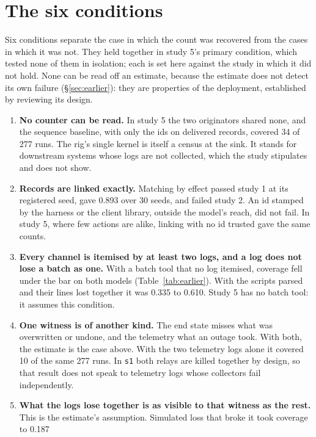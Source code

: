 \documentclass[11pt]{article}
\begin{document}
\section{The six conditions}
\label{sec:when}

Six conditions separate the case in which the count was recovered from the cases in
which it was not. They held together in study 5's primary condition, which tested none
of them in isolation; each is set here against the study in which it did not hold. None
can be read off an estimate, because the estimate does not detect its own failure
(\S\ref{sec:earlier}): they are properties of the deployment, established by reviewing
its design.

\begin{enumerate}\setlength\itemsep{1pt}\setlength\parskip{0pt}
\item \textbf{No counter can be read.} In study 5 the two originators shared none, and
the sequence baseline, with only the ids on delivered records, covered 34 of 277 runs.
The rig's single kernel is itself a census at the sink. It stands for downstream systems
whose logs are not collected, which the study stipulates and does not show.
\item \textbf{Records are linked exactly.} Matching by effect passed study 1 at its
registered seed, gave 0.893 over 30 seeds, and failed study 2. An id stamped by
the harness or the client library, outside the model's reach, did not fail. In
study 5, where few actions are alike, linking with no id trusted gave the same counts.
\item \textbf{Every channel is itemised by at least two logs, and a log does not lose a
batch as one.} With a batch tool that no log itemised, coverage fell under the bar on
both models (Table~\ref{tab:earlier}). With the scripts parsed and their lines lost together it was 0.335 to 0.610. Study 5 has
no batch tool: it assumes this condition.
\item \textbf{One witness is of another kind.} The end state misses what was overwritten
or undone, and the telemetry what an outage took. With both, the estimate is the case
above. With the two telemetry logs alone it covered 10 of the same 277 runs. In
\texttt{s1} both relays are killed together by design, so that result does not speak to
telemetry logs whose collectors fail independently.
\item \textbf{What the logs lose together is as visible to that witness as the rest.}
This is the estimate's assumption. Simulated loss that broke it took coverage to 0.187

\end{enumerate}
\end{document}
